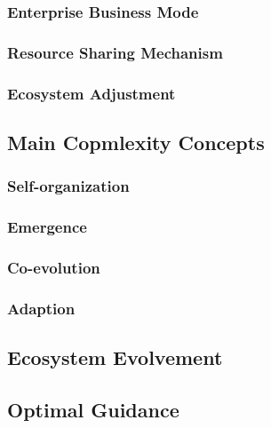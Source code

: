 \subsubsection{Enterprise Business Mode}

\subsubsection{Resource Sharing Mechanism}

\subsubsection{Ecosystem Adjustment}


\subsection{Main Copmlexity Concepts} %
\label{sub:main_copmlexity_concepts}

\subsubsection{Self-organization}

\subsubsection{Emergence}

\subsubsection{Co-evolution}

\subsubsection{Adaption}

\subsection{Ecosystem Evolvement} %
\label{sub:ecosystem_evolvement}


\subsection{Optimal Guidance} %
\label{sub:optimal_guidance}

